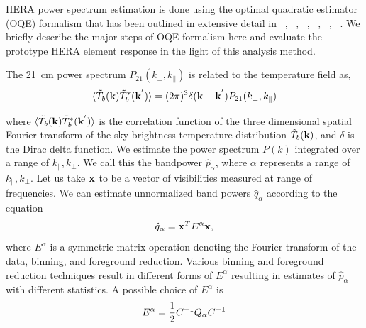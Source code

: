 \documentclass[twocolumn]{emulateapj}
\begin{document}
    HERA power spectrum estimation is done using the optimal quadratic estimator
    (OQE) formalism that has been outlined in extensive detail in  ~\cite{liu_et_al2010}, ~\cite{dillon_et_al2013a}, ~\cite{liu_et_al2014a}, ~\cite{liu_et_al2014b}, ~\cite{trott_et_al2012}, ~\cite{Ali_et_al2015}. We briefly  describe the major steps of OQE formalism here and evaluate the prototype HERA element response in the light of this analysis method.
    
The 21~cm power spectrum $P_{21}(k_\perp,k_\parallel)$ is related to the temperature field as, 
    \begin{equation}
    \langle  \tilde T_{b}(\bold k) \tilde T_{b}^{*}(\bold k^{'}) \rangle = (2\pi)^{3} \delta (\bold k - \bold k^{'})P_{21}(k_\perp,k_\parallel)
    \label{eq14}
    \end{equation}
    
    where $\langle  \tilde T_{b}(\bold k) \tilde T_{b}^{*}(\bold k^{'}) \rangle $ is the correlation function of the three dimensional spatial Fourier transform of the sky brightness temperature distribution $ \tilde T_{b}(\bold k)$, and $\delta$ is the Dirac delta function. %
 We estimate the power spectrum $P(k)$ integrated over a range of $k_\parallel, k_\perp$.  We call this 
the bandpower $\hat p_{\alpha}$, where $\alpha$ represents a range of $k_{\parallel}, k_{\perp}$. Let us take
$\bold x$ to be a vector of visibilities measured at range of frequencies.  We can estimate unnormalized
band powers $\hat q_\alpha$ according to the equation
    \begin{equation}
    \hat q_{\alpha} = \bold x^{T} E^{\alpha} \bold x, %
    \label{eq15}
    \end{equation}
 where $E^{\alpha}$ is a symmetric matrix operation denoting the Fourier transform of the data, binning, and foreground reduction. Various binning and foreground reduction techniques result in different forms of $E^{\alpha}$ resulting in estimates of $\hat p_{\alpha}$ with different statistics. A possible choice of $E^{\alpha}$ is
    \begin{equation}
    E^{\alpha} =  {1 \over 2} C^{-1} Q_{\alpha} C^{-1}
    \label{eq16}
    \end{equation} 
    
\end{document}
